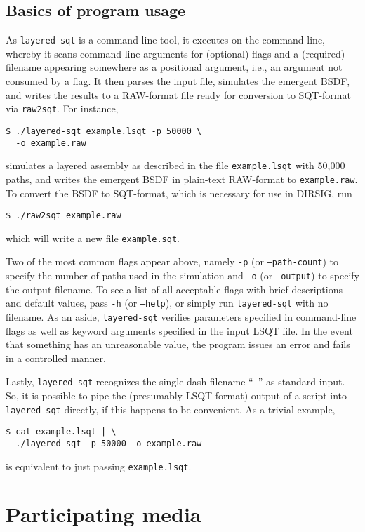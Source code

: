 \documentclass[
    twoside,
    twocolumn,
    letterpaper,
    defaultfont,
    rmheading,
    10pt]{article}
\begin{document}
\subsection{Basics of program usage}

As \texttt{layered-sqt} is a command-line tool, it executes 
on the command-line, whereby it scans command-line arguments for 
(optional) flags and a (required) filename appearing somewhere as a 
positional argument, i.e., an argument not consumed by 
a flag. It then parses the input file, simulates the emergent BSDF,
and writes the results to a RAW-format file ready for conversion to
SQT-format via \texttt{raw2sqt}. For instance, 
\begin{verbatim}
$ ./layered-sqt example.lsqt -p 50000 \
  -o example.raw
\end{verbatim}
simulates a layered assembly as described in the file \texttt{example.lsqt} 
with 50,000 paths, and writes the emergent BSDF in plain-text RAW-format to
\texttt{example.raw}. To convert the BSDF to SQT-format, which is necessary
for use in DIRSIG, run
\begin{verbatim}
$ ./raw2sqt example.raw
\end{verbatim}
which will write a new file \texttt{example.sqt}.

Two of the most common flags appear above, namely
\texttt{-p} (or \texttt{--path-count}) to specify the number of paths used in
the simulation and \texttt{-o} (or \texttt{--output}) to specify the output 
filename. To see a list of all acceptable flags with brief descriptions and 
default values, pass \texttt{-h} (or \texttt{--help}), or simply run 
\texttt{layered-sqt} with no filename. As an aside,
\texttt{layered-sqt} verifies parameters specified in command-line flags
as well as keyword arguments specified in the input LSQT file.
In the event that something has an unreasonable value, the program
issues an error and fails in a controlled manner.

Lastly, \texttt{layered-sqt} recognizes the single dash filename 
``\texttt{-}'' as standard input. So, it is possible to pipe the 
(presumably LSQT format) output of a script into \texttt{layered-sqt} 
directly, if this happens to be convenient. As a trivial example,
\begin{verbatim}
$ cat example.lsqt | \
  ./layered-sqt -p 50000 -o example.raw -
\end{verbatim}
is equivalent to just passing \texttt{example.lsqt}.

\section{Participating media}
\end{document}
